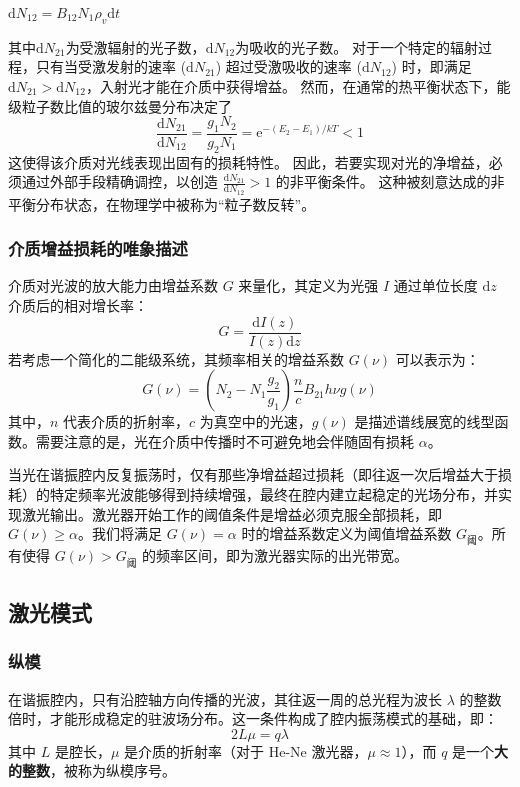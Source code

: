 \documentclass[a4paper, 1.5lines]{ctexart}
\begin{document}
            \centerline{$\mathrm{d}N_{12} = B_{12} N_1 \rho_v \mathrm{d}t$}

            其中$\mathrm{d}N_{21}$为受激辐射的光子数，$\mathrm{d}N_{12}$为吸收的光子数。
            对于一个特定的辐射过程，只有当受激发射的速率 ($\mathrm{d}N_{21}$) 超过受激吸收的速率 ($\mathrm{d}N_{12}$) 时，即满足 $\mathrm{d}N_{21} > \mathrm{d}N_{12}$，入射光才能在介质中获得增益。
            然而，在通常的热平衡状态下，能级粒子数比值的玻尔兹曼分布决定了
            $$
            \frac{\mathrm{d}N_{21}}{\mathrm{d}N_{12}} = \frac{g_1 N_2}{g_2 N_1} = \mathrm{e}^{-(E_2 - E_1)/kT} < 1
            $$
            这使得该介质对光线表现出固有的损耗特性。
            因此，若要实现对光的净增益，必须通过外部手段精确调控，以创造 $\frac{\mathrm{d}N_{21}}{\mathrm{d}N_{12}}>1$ 的非平衡条件。
            这种被刻意达成的非平衡分布状态，在物理学中被称为“粒子数反转”。
            \subsubsection{介质增益损耗的唯象描述}
            介质对光波的放大能力由{增益系数} $G$ 来量化，其定义为光强 $I$ 通过单位长度 $\mathrm{d}z$ 介质后的相对增长率：
            $$
            G = \frac{\mathrm{d}I(z)}{I(z)\mathrm{d}z}
            $$
            若考虑一个简化的二能级系统，其频率相关的增益系数 $G(\nu)$ 可以表示为：
            $$
            G(\nu) = \left(N_2 - N_1\frac{g_2}{g_1}\right) \frac{n}{c}B_{21}h\nu g(\nu)
            $$
            其中，$n$ 代表介质的折射率，$c$ 为真空中的光速，$g(\nu)$ 是描述谱线展宽的线型函数。需要注意的是，光在介质中传播时不可避免地会伴随固有损耗 $\alpha$。

            当光在谐振腔内反复振荡时，仅有那些{净增益超过损耗}（即往返一次后增益大于损耗）的特定频率光波能够得到持续增强，最终在腔内建立起稳定的光场分布，并实现激光输出。激光器开始工作的{阈值条件}是增益必须克服全部损耗，即 $G(\nu) \ge \alpha$。我们将满足 $G(\nu) = \alpha$ 时的增益系数定义为{阈值增益系数} $G_{\text{阈}}$。所有使得 $G(\nu) > G_{\text{阈}}$ 的频率区间，即为激光器实际的{出光带宽}。
        \subsection{激光模式}
            \subsubsection{纵模}
            在谐振腔内，只有沿腔轴方向传播的光波，其往返一周的总光程为波长 $\lambda$ 的整数倍时，才能形成稳定的驻波场分布。这一条件构成了腔内振荡模式的基础，即：
            $$
            2L\mu = q\lambda
            $$
            其中 $L$ 是腔长，$\mu$ 是介质的折射率（对于 He-Ne 激光器，$\mu \approx 1$），而 $q$ 是一个\textbf{大的整数}，被称为纵模序号。
\end{document}
